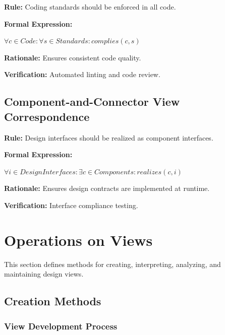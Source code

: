 \documentclass[11pt,letterpaper]{article}
\begin{document}
\begin{definitionbox}
\textbf{Rule:} Coding standards should be enforced in all code.

\textbf{Formal Expression:}
\begin{center}
$\forall c \in Code : \forall s \in Standards : complies(c, s)$
\end{center}

\textbf{Rationale:} Ensures consistent code quality.

\textbf{Verification:} Automated linting and code review.
\end{definitionbox}

\subsection{Component-and-Connector View Correspondence}

\begin{definitionbox}
\textbf{Rule:} Design interfaces should be realized as component interfaces.

\textbf{Formal Expression:}
\begin{center}
$\forall i \in DesignInterfaces : \exists c \in Components : realizes(c, i)$
\end{center}

\textbf{Rationale:} Ensures design contracts are implemented at runtime.

\textbf{Verification:} Interface compliance testing.
\end{definitionbox}

\section{Operations on Views}

This section defines methods for creating, interpreting, analyzing, and maintaining design views.

\subsection{Creation Methods}

\subsubsection{View Development Process}
\end{document}
